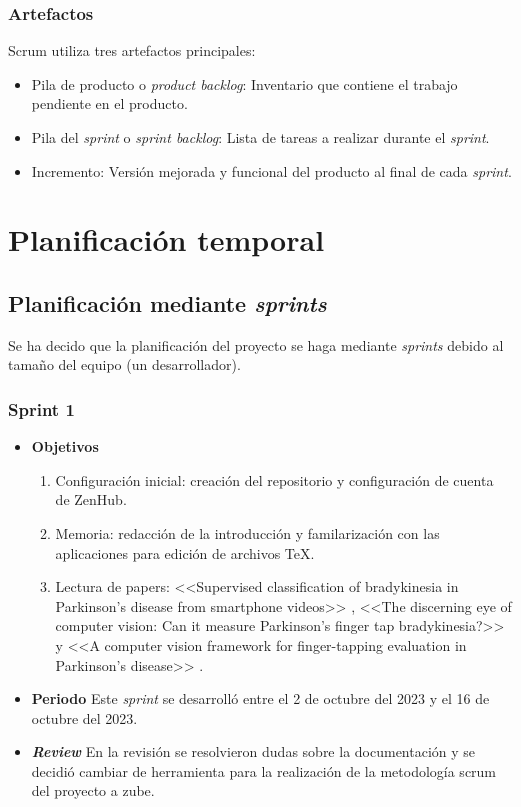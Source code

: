 \subsubsection{Artefactos}
Scrum utiliza tres artefactos principales:
\begin{itemize}
\item Pila de producto o \textsl{product backlog}: Inventario que contiene el trabajo pendiente en el producto.
\item Pila del \textsl{sprint} o \textsl{sprint backlog}: Lista de tareas a realizar durante el \textsl{sprint}.
\item Incremento: Versión mejorada y funcional del producto al final de cada \textsl{sprint}.
\end{itemize}




 
\section{Planificación temporal}
\subsection{Planificación mediante \textsl{sprints}}
Se ha decido que la planificación del proyecto se haga mediante \textsl{sprints} debido al tamaño del equipo (un desarrollador).


\subsubsection{Sprint 1}
\begin{itemize}
\item \textbf{Objetivos}
\begin{enumerate}
\item Configuración inicial: creación del repositorio y configuración de cuenta de ZenHub.
\item Memoria: redacción de la introducción y familarización con las aplicaciones para edición de archivos \TeX .
\item Lectura de papers:  <<Supervised classification of bradykinesia in Parkinson’s disease from smartphone videos>>  \cite{williams2020discerning}, <<The discerning eye of computer vision: Can it measure Parkinson's finger tap bradykinesia?>> \cite{williams2020supervised}  y <<A computer vision framework for finger-tapping evaluation in Parkinson's disease>> \cite{khan2014computer}.
\end{enumerate}
\item \textbf{Periodo}
Este \textsl{sprint} se desarrolló entre el 2 de octubre del 2023 y el 16 de octubre del 2023.
\item \textbf{\textsl{Review}}
En la revisión se resolvieron dudas sobre la documentación y se decidió cambiar de herramienta para la realización de la metodología scrum del proyecto a zube. 


\end{itemize}

